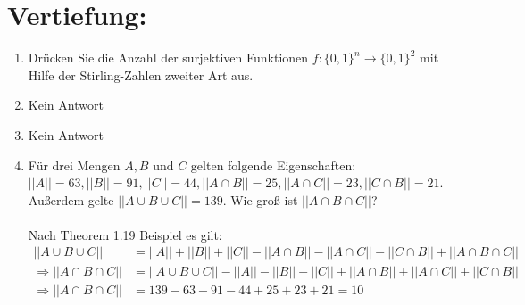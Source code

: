 



    \maketitle
    \section*{Vertiefung:}
    \begin{enumerate}[label=(\alph*)]
        \item Drücken Sie die Anzahl der surjektiven Funktionen 
        $f : \{0, 1\}^n \to \{0, 1\}^2$ mit Hilfe der Stirling-Zahlen zweiter Art aus.

        \item Kein Antwort

        \item Kein Antwort

        \item Für drei Mengen $A, B$ und $C$ gelten folgende Eigenschaften: 
        $||A|| = 63, ||B|| = 91, ||C|| = 44, ||A\cap B|| = 25, ||A\cap C|| = 23, ||C \cap B|| = 21$. 
        Außerdem gelte $||A\cup B\cup C|| = 139$. Wie groß ist $||A \cap B \cap C||$?\\\\
        Nach Theorem 1.19 Beispiel es gilt:
        \begin{align*}
        ||A\cup B\cup C|| &= ||A|| + ||B|| + ||C|| - ||A\cap B|| - ||A\cap C|| - ||C \cap B|| + ||A \cap B \cap C||\\
        \Rightarrow ||A \cap B \cap C|| &= ||A\cup B\cup C|| - ||A|| - ||B|| - ||C|| + ||A\cap B|| + ||A\cap C|| + ||C \cap B|| \\
        \Rightarrow ||A \cap B \cap C|| &= 139 - 63 - 91 - 44 + 25 + 23 + 21 = 10 \\
        \end{align*}
    \end{enumerate}
